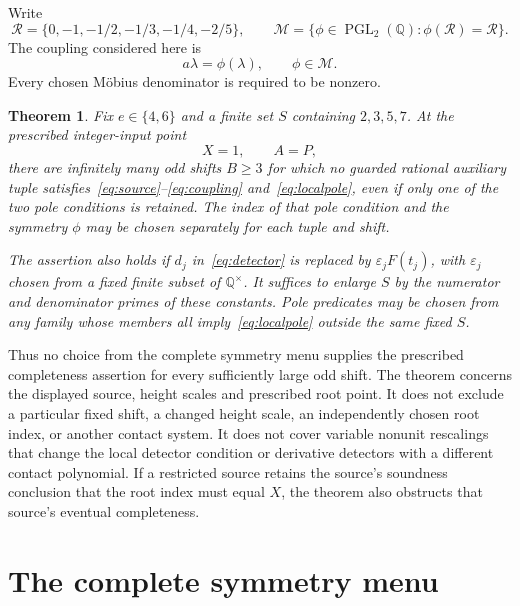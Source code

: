 \documentclass[11pt,a4paper]{article}
\newtheorem{theorem}{Theorem}[section]
\newcommand{\Q}{\mathbb Q}\newcommand{\Z}{\mathbb Z}
\begin{document}
Write
\[
 \mathcal R=\{0,-1,-1/2,-1/3,-1/4,-2/5\},\qquad
 \mathcal M=\{\phi\in\operatorname{PGL}_2(\Q):\phi(\mathcal R)=\mathcal R\}.
\]
The coupling considered here is
\begin{equation}\label{eq:coupling}
                         a\lambda=\phi(\lambda),\qquad\phi\in\mathcal M.
\end{equation}
Every chosen M\"obius denominator is required to be nonzero.

\begin{theorem}\label{thm:main}
Fix $e\in\{4,6\}$ and a finite set $S$ containing $2,3,5,7$.
At the prescribed integer-input point
\[
                        X=1,\qquad A=P,
\]
there are infinitely many odd shifts $B\ge3$ for which no guarded
rational auxiliary tuple satisfies~\eqref{eq:source}--\eqref{eq:coupling}
and~\eqref{eq:localpole}, even if only one of the two pole conditions
is retained. The index of that pole condition and the symmetry
$\phi$ may be chosen separately for each tuple and shift.

The assertion also holds if $d_j$ in~\eqref{eq:detector} is replaced
by $\varepsilon_jF(t_j)$, with $\varepsilon_j$ chosen from a fixed finite
subset of $\Q^\times$. It suffices to enlarge $S$ by the numerator
and denominator primes of these constants. Pole predicates may be
chosen from any family whose members all imply~\eqref{eq:localpole}
outside the same fixed $S$.
\end{theorem}

Thus no choice from the complete symmetry menu supplies the prescribed
completeness assertion for every sufficiently large odd shift. The
theorem concerns the displayed source, height scales and prescribed
root point. It does not exclude a particular fixed shift, a changed
height scale, an independently chosen root index, or another contact
system. It does not cover variable nonunit rescalings that change the
local detector condition or derivative detectors with a different
contact polynomial. If a restricted source retains the source's
soundness conclusion that the root index must equal $X$, the theorem
also obstructs that source's eventual completeness.

\section{The complete symmetry menu}
\end{document}
